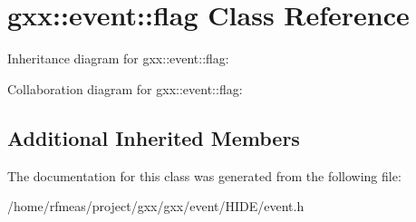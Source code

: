 \hypertarget{classgxx_1_1event_1_1flag}{}\section{gxx\+:\+:event\+:\+:flag Class Reference}
\label{classgxx_1_1event_1_1flag}


Inheritance diagram for gxx\+:\+:event\+:\+:flag\+:


Collaboration diagram for gxx\+:\+:event\+:\+:flag\+:
\subsection*{Additional Inherited Members}


The documentation for this class was generated from the following file\+:\begin{DoxyCompactItemize}
\item 
/home/rfmeas/project/gxx/gxx/event/\+H\+I\+D\+E/event.\+h\end{DoxyCompactItemize}
